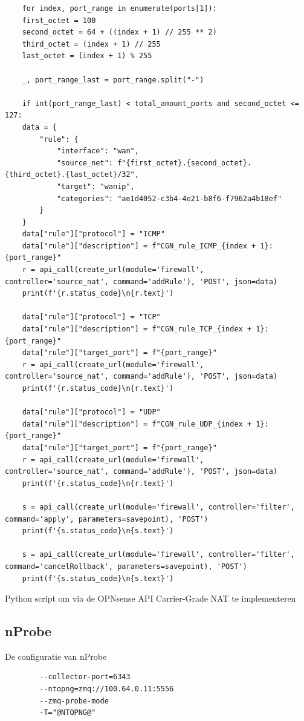 \begin{verbatim}
    for index, port_range in enumerate(ports[1]):
    first_octet = 100
    second_octet = 64 + ((index + 1) // 255 ** 2)
    third_octet = (index + 1) // 255
    last_octet = (index + 1) % 255

    _, port_range_last = port_range.split("-")

    if int(port_range_last) < total_amount_ports and second_octet <= 127:
    data = {
        "rule": {
            "interface": "wan",
            "source_net": f"{first_octet}.{second_octet}.{third_octet}.{last_octet}/32",
            "target": "wanip",
            "categories": "ae1d4052-c3b4-4e21-b8f6-f7962a4b18ef"
        }
    }
    data["rule"]["protocol"] = "ICMP"
    data["rule"]["description"] = f"CGN_rule_ICMP_{index + 1}: {port_range}"
    r = api_call(create_url(module='firewall', controller='source_nat', command='addRule'), 'POST', json=data)
    print(f'{r.status_code}\n{r.text}')

    data["rule"]["protocol"] = "TCP"
    data["rule"]["description"] = f"CGN_rule_TCP_{index + 1}: {port_range}"
    data["rule"]["target_port"] = f"{port_range}"
    r = api_call(create_url(module='firewall', controller='source_nat', command='addRule'), 'POST', json=data)
    print(f'{r.status_code}\n{r.text}')

    data["rule"]["protocol"] = "UDP"
    data["rule"]["description"] = f"CGN_rule_UDP_{index + 1}: {port_range}"
    data["rule"]["target_port"] = f"{port_range}"
    r = api_call(create_url(module='firewall', controller='source_nat', command='addRule'), 'POST', json=data)
    print(f'{r.status_code}\n{r.text}')

    s = api_call(create_url(module='firewall', controller='filter', command='apply', parameters=savepoint), 'POST')
    print(f'{s.status_code}\n{s.text}')

    s = api_call(create_url(module='firewall', controller='filter', command='cancelRollback', parameters=savepoint), 'POST')
    print(f'{s.status_code}\n{s.text}')
\end{verbatim}
\begin{listing}[!htbp]
    \caption[Python CGN code]{Python script om via de OPNsense API Carrier-Grade NAT te implementeren}
    \label{code:PythonCGN}
\end{listing}

\subsection{nProbe}
\begin{listing}[H]
    \caption[nProbe configuration]{De configuratie van nProbe}
    \label{code:nProbeConf}

    \begin{verbatim}
        --collector-port=6343
        --ntopng=zmq://100.64.0.11:5556
        --zmq-probe-mode
        -T="@NTOPNG@"
    \end{verbatim}
\end{listing}

